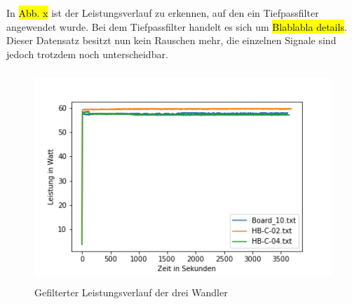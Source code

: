 In \hl{Abb. x} ist der Leistungsverlauf zu erkennen, auf den ein Tiefpassfilter angewendet wurde. Bei dem Tiefpassfilter handelt es sich um \hl{Blablabla details}. Dieser Datensatz besitzt nun kein Rauschen mehr, die einzelnen Signale sind jedoch trotzdem noch unterscheidbar. 


\begin{figure}[H]
    \centering
    \includegraphics[height= 8cm, width = \textwidth]{Pictures/3_Board_Leistung_Filtered.png}
    \caption{Gefilterter Leistungsverlauf der drei Wandler}
\end{figure}


